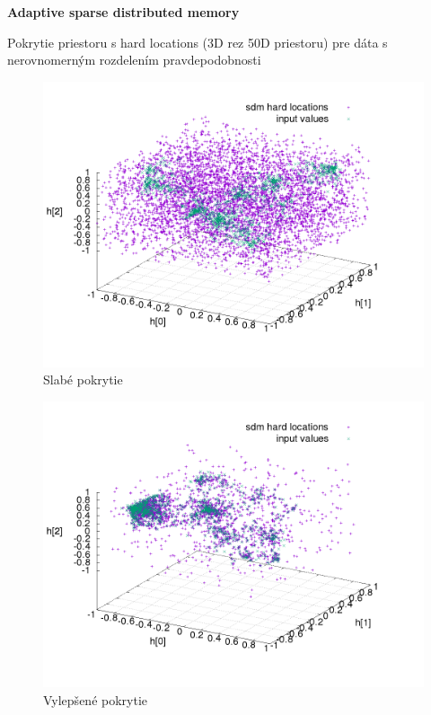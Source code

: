 \documentclass[xcolor=dvipsnames]{beamer}
\begin{document}
\begin{frame}{\bf Adaptive sparse distributed memory}

Pokrytie priestoru s hard locations (3D rez 50D priestoru) pre dáta
s nerovnomerným rozdelením pravdepodobnosti

\begin{minipage}{.5\textwidth}

\begin{figure}[!htb]
\includegraphics[scale=.25]{../pictures/sdm_hard_locations_all_original.png}
\caption{Slabé pokrytie}
\label{img:oroginal_sdm}
\end{figure}


\end{minipage}%
\begin{minipage}{.5\textwidth}

\begin{figure}[!htb]
\includegraphics[scale=.25]{../pictures/sdm_hard_locations_all_new.png}
\caption{Vylepšené pokrytie}
\label{img:adaptive_sdm}
\end{figure}


\end{minipage}

\end{frame}
\end{document}
